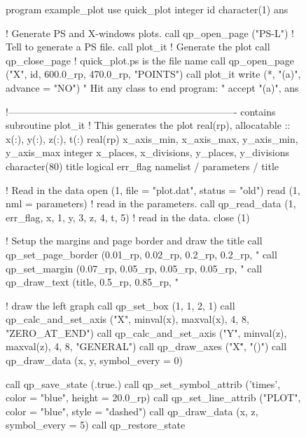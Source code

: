 \begin{figure}
\footnotesize
\begin{listing}{1}
  program example_plot
    use quick_plot
    integer id
    character(1) ans
  
    ! Generate PS and X-windows plots.
    call qp_open_page ("PS-L")  ! Tell \quickplot to generate a PS file.
    call plot_it              ! Generate the plot
    call qp_close_page        ! quick_plot.ps is the file name
    call qp_open_page ("X", id, 600.0_rp, 470.0_rp, "POINTS")
    call plot_it
    write (*, "(a)", advance = "NO") " Hit any class to end program: "
    accept "(a)", ans

  !----------------------------------------------------------------------
  contains
  subroutine plot_it                             ! This generates the plot
    real(rp), allocatable :: x(:), y(:), z(:), t(:)
    real(rp) x_axis_min, x_axis_max, y_axis_min, y_axis_max
    integer x_places, x_divisions, y_places, y_divisions
    character(80) title
    logical err_flag
    namelist / parameters / title

    ! Read in the data
    open (1, file = "plot.dat", status = "old")
    read (1, nml = parameters)                  ! read in the parameters.
    call qp_read_data (1, err_flag, x, 1, y, 3, z, 4, t, 5) ! read in the data.
    close (1)

    ! Setup the margins and page border and draw the title
    call qp_set_page_border (0.01_rp, 0.02_rp, 0.2_rp, 0.2_rp, "%
    call qp_set_margin (0.07_rp, 0.05_rp, 0.05_rp, 0.05_rp, "%
    call qp_draw_text (title, 0.5_rp, 0.85_rp, "%

    ! draw the left graph
    call qp_set_box (1, 1, 2, 1)
    call qp_calc_and_set_axis ("X", minval(x), maxval(x), 4, 8, "ZERO_AT_END")
    call qp_calc_and_set_axis ("Y", minval(z), maxval(z), 4, 8, "GENERAL")
    call qp_draw_axes ("X\dlab\u", "\gb(\A)")
    call qp_draw_data (x, y, symbol_every = 0)

    call qp_save_state (.true.)
    call qp_set_symbol_attrib ('times', color = "blue", height = 20.0_rp)
    call qp_set_line_attrib ("PLOT", color = "blue", style = "dashed")
    call qp_draw_data (x, z, symbol_every = 5)
    call qp_restore_state


\end{listing}
\end{figure}
